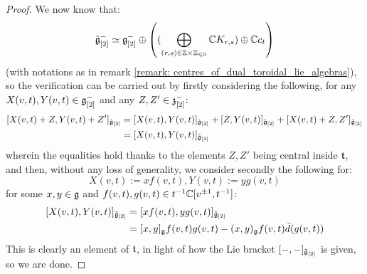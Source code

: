                 \begin{proof}
                    We now know that:
                        $$\tilde{\g}_{[2]}^- \cong \g_{[2]}^- \oplus \left( ( \bigoplus_{(r, s) \in \Z \x \Z_{\leq 0}} \bbC K_{r, s}) \oplus \bbC c_t \right)$$
                    (with notations as in remark \ref{remark: centres_of_dual_toroidal_lie_algebras}), so the verification can be carried out by firstly considering the following, for any $X(v, t), Y(v, t) \in \mathfrak{g}_{[2]}^-$ and any $Z, Z' \in \mathfrak{z}_{[2]}^-$:
                        $$
                            \begin{aligned}
                                [ X(v, t) + Z, Y(v, t) + Z' ]_{\tilde{\g}_{[2]}} & = [ X(v, t), Y(v, t) ]_{\tilde{\g}_{[2]}} + [ Z, Y(v, t) ]_{\tilde{\g}_{[2]}} + [X(v, t) + Z, Z']_{\tilde{\g}_{[2]}}
                                \\
                                & = [ X(v, t), Y(v, t) ]_{\tilde{\g}_{[2]}}
                            \end{aligned}
                        $$
                    wherein the equalities hold thanks to the elements $Z, Z'$ being central inside $\mathfrak{t}$, and then, without any loss of generality, we consider secondly the following for:
                        $$X(v, t) := x f(v, t), Y(v, t) := y g(v, t)$$
                    for some $x, y \in \mathfrak{g}$ and $f(v, t), g(v, t) \in t^{-1}\mathbb{C}[v^{\pm 1}, t^{-1}]$:
                        $$
                            \begin{aligned}
                                [ X(v, t), Y(v, t) ]_{\tilde{\g}_{[2]}} & = [ x f(v, t), y g(v, t) ]_{\tilde{\g}_{[2]}}
                                \\
                                & = [x, y]_{\g} f(v, t) g(v, t) - (x, y)_{\g} f(v, t) \bar{d}( g(v, t) )
                            \end{aligned}
                        $$
                    This is clearly an element of $\mathfrak{t}$, in light of how the Lie bracket $[-, -]_{\tilde{\mathfrak{g}}_{[2]}}$ is given, so we are done. 
                \end{proof}

